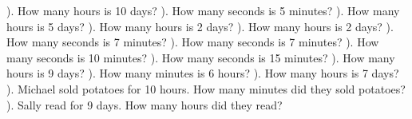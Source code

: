 \documentclass{article}%
\begin{document}
). How many hours is 10 days?%
\newline%
\newline%
). How many seconds is 5 minutes?%
\newline%
\newline%
). How many hours is 5 days?%
\newline%
\newline%
). How many hours is 2 days?%
\newline%
\newline%
). How many hours is 2 days?%
\newline%
\newline%
). How many seconds is 7 minutes?%
\newline%
\newline%
). How many seconds is 7 minutes?%
\newline%
\newline%
). How many seconds is 10 minutes?%
\newline%
\newline%
). How many seconds is 15 minutes?%
\newline%
\newline%
). How many hours is 9 days?%
\newline%
\newline%
). How many minutes is 6 hours?%
\newline%
\newline%
). How many hours is 7 days?%
\newline%
\newline%
). Michael sold potatoes for 10 hours. How many minutes did they sold potatoes?%
\newline%
\newline%
). Sally read for 9 days. How many hours did they read?%
\newline%
\end{document}
